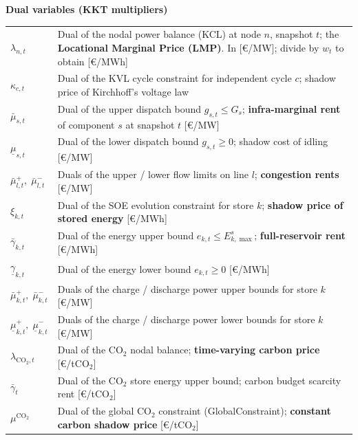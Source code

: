 \documentclass{article}
\begin{document}
\medskip
\noindent\textbf{Dual variables (KKT multipliers)}\par\smallskip
\noindent\begin{tabular}{lp{11cm}}
$\lambda_{n,t}$ & Dual of the nodal power balance (KCL) at node $n$, snapshot $t$;
                  the \textbf{Locational Marginal Price (LMP)}.
                  In [\euro/MW]; divide by $w_t$ to obtain [\euro/MWh] \\
$\kappa_{c,t}$ & Dual of the KVL cycle constraint for independent cycle $c$;
                 shadow price of Kirchhoff's voltage law \\
$\bar{\mu}_{s,t}$ & Dual of the upper dispatch bound $g_{s,t} \le G_s$;
                    \textbf{infra-marginal rent} of component $s$ at snapshot $t$
                    [\euro/MW] \\
$\underline{\mu}_{s,t}$ & Dual of the lower dispatch bound $g_{s,t} \ge 0$;
                          shadow cost of idling [\euro/MW] \\
$\bar{\mu}^+_{l,t},\; \bar{\mu}^-_{l,t}$ & Duals of the upper / lower flow limits on line $l$;
                    \textbf{congestion rents} [\euro/MW] \\
$\xi_{k,t}$ & Dual of the SOE evolution constraint for store $k$;
              \textbf{shadow price of stored energy} [\euro/MWh] \\
$\bar{\gamma}_{k,t}$ & Dual of the energy upper bound $e_{k,t} \le E^s_{k,\max}$;
                       \textbf{full-reservoir rent} [\euro/MWh] \\
$\underline{\gamma}_{k,t}$ & Dual of the energy lower bound $e_{k,t} \ge 0$ [\euro/MWh] \\
$\bar{\mu}^+_{k,t},\; \bar{\mu}^-_{k,t}$ & Duals of the charge / discharge power upper bounds
                    for store $k$ [\euro/MW] \\
$\underline{\mu}^+_{k,t},\; \underline{\mu}^-_{k,t}$ & Duals of the charge / discharge power
                    lower bounds for store $k$ [\euro/MW] \\
$\lambda_{\mathrm{CO_2},t}$ & Dual of the CO$_2$ nodal balance;
                              \textbf{time-varying carbon price} [\euro/tCO$_2$] \\
$\bar{\gamma}_t$ & Dual of the CO$_2$ store energy upper bound;
                   carbon budget scarcity rent [\euro/tCO$_2$] \\
$\mu^{\mathrm{CO_2}}$ & Dual of the global CO$_2$ constraint (GlobalConstraint);
                        \textbf{constant carbon shadow price} [\euro/tCO$_2$] \\
\end{tabular}
\end{document}
